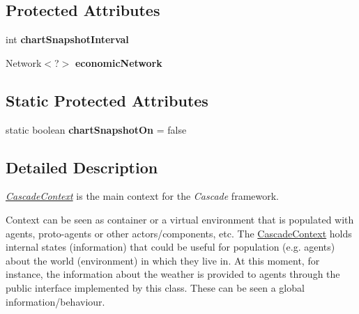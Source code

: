 \subsection*{Protected Attributes}
\begin{DoxyCompactItemize}
\item 
\hypertarget{classuk_1_1ac_1_1dmu_1_1iesd_1_1cascade_1_1context_1_1_cascade_context_a150922ac6d35f41350f2413fe2514efd}{int {\bfseries chart\-Snapshot\-Interval}}\label{classuk_1_1ac_1_1dmu_1_1iesd_1_1cascade_1_1context_1_1_cascade_context_a150922ac6d35f41350f2413fe2514efd}

\item 
\hypertarget{classuk_1_1ac_1_1dmu_1_1iesd_1_1cascade_1_1context_1_1_cascade_context_a1396fb95eb98521b664de3a3947d786d}{Network$<$?$>$ {\bfseries economic\-Network}}\label{classuk_1_1ac_1_1dmu_1_1iesd_1_1cascade_1_1context_1_1_cascade_context_a1396fb95eb98521b664de3a3947d786d}

\end{DoxyCompactItemize}
\subsection*{Static Protected Attributes}
\begin{DoxyCompactItemize}
\item 
\hypertarget{classuk_1_1ac_1_1dmu_1_1iesd_1_1cascade_1_1context_1_1_cascade_context_aa99cbeb70a4b4378fc638d74411e9019}{static boolean {\bfseries chart\-Snapshot\-On} = false}\label{classuk_1_1ac_1_1dmu_1_1iesd_1_1cascade_1_1context_1_1_cascade_context_aa99cbeb70a4b4378fc638d74411e9019}

\end{DoxyCompactItemize}


\subsection{Detailed Description}
{\itshape \hyperlink{classuk_1_1ac_1_1dmu_1_1iesd_1_1cascade_1_1context_1_1_cascade_context}{Cascade\-Context}} is the main context for the {\itshape Cascade} framework. 

Context can be seen as container or a virtual environment that is populated with agents, proto-\/agents or other actors/components, etc. The {\ttfamily \hyperlink{classuk_1_1ac_1_1dmu_1_1iesd_1_1cascade_1_1context_1_1_cascade_context}{Cascade\-Context}} holds internal states (information) that could be useful for population (e.\-g. agents) about the world (environment) in which they live in. At this moment, for instance, the information about the weather is provided to agents through the public interface implemented by this class. These can be seen a global information/behaviour.

